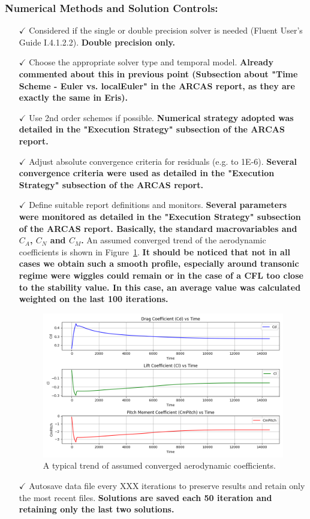 \documentclass[12pt]{article}
\begin{document}
\subsubsection*{Numerical Methods and Solution Controls:}
\begin{itemize}
\item[$\checkmark$] Considered if the single or double precision solver is needed (Fluent User's Guide I.4.1.2.2). \textbf{Double precision only.}
    \item[$\checkmark$] Choose the appropriate solver type and temporal model. \textbf{Already commented about this in previous point (Subsection about "Time Scheme - Euler vs. localEuler" in the ARCAS report, as they are exactly the same in Eris).}
    \item[$\checkmark$] Use 2nd order schemes if possible. \textbf{Numerical strategy adopted was detailed in the "Execution Strategy" subsection of the ARCAS report.}
    \item[$\checkmark$] Adjust absolute convergence criteria for residuals (e.g. to 1E-6).
    \textbf{Several convergence criteria were used as detailed in the "Execution Strategy" subsection of the ARCAS report.}
    \item[$\checkmark$] Define suitable report definitions and monitors. \textbf{ Several parameters were monitored as detailed in the "Execution Strategy" subsection of the ARCAS report. Basically, the standard macrovariables and $C_A$, $C_N$ and $C_M$.} An assumed converged trend of the aerodynamic coefficients is shown in Figure~\ref{fig:aero-conv}. \textbf{It should be noticed that not in all cases we obtain such a smooth profile, especially around transonic regime were wiggles could remain or in the case of a CFL too close to the stability value. In this case, an average value was calculated weighted on the last 100 iterations.}
    \begin{figure}[H]
        \centering
        \includegraphics[width=0.95\linewidth]{figs/eris/S123F/aero_conv.png}
        \caption{A typical trend of assumed converged aerodynamic coefficients.}
        \label{fig:aero-conv}
    \end{figure}
    \item[$\checkmark$] Autosave data file every XXX iterations to preserve results and retain only the most recent files. \textbf{Solutions are saved each 50 iteration and retaining only the last two solutions.}
\end{itemize}
\end{document}
